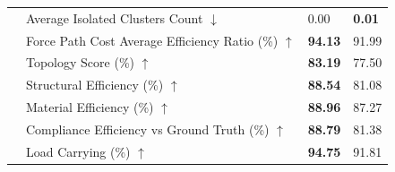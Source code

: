 \begin{table}[!h]
{\begin{tabular}{llll}
 & Average Isolated Clusters Count $\downarrow$ & 0.00 & \textbf{0.01} \\
 & Force Path Cost Average Efficiency Ratio (\%) $\uparrow$ & \textbf{94.13} & 91.99 \\
 & Topology Score (\%) $\uparrow$ & \textbf{83.19} & 77.50 \\
 & Structural Efficiency (\%) $\uparrow$ & \textbf{88.54} & 81.08 \\
 & Material Efficiency (\%) $\uparrow$ & \textbf{88.96} & 87.27 \\
 & Compliance Efficiency vs Ground Truth (\%) $\uparrow$ & \textbf{88.79} & 81.38 \\
 & Load Carrying (\%) $\uparrow$ & \textbf{94.75} & 91.81 \\
    \bottomrule
  \end{tabular}
  }
\end{table}